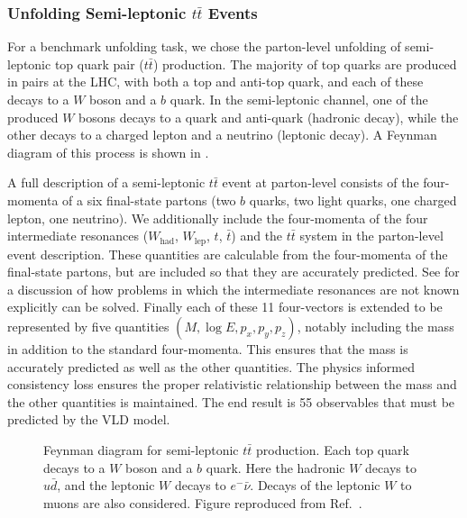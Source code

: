\subsubsection{Unfolding Semi-leptonic $t\bar{t}$ Events}

For a benchmark unfolding task, we chose the parton-level unfolding of semi-leptonic top quark pair ($t\bar{t}$) production.
The majority of top quarks are produced in pairs at the LHC, with both a top and anti-top quark, and each of these decays to a $W$ boson and a $b$ quark.
In the semi-leptonic channel, one of the produced $W$ bosons decays to a quark and anti-quark (hadronic decay), while the other decays to a charged lepton and a neutrino (leptonic decay).
A Feynman diagram of this process is shown in .

A full description of a semi-leptonic $t\bar{t}$ event at parton-level consists of the four-momenta of a six final-state partons (two $b$ quarks, two light quarks, one charged lepton, one neutrino).
We additionally include the four-momenta of the four intermediate resonances ($W_\text{had}$, $W_\text{lep}$, $t$, $\bar{t}$) and the $t\bar{t}$ system in the parton-level event description.
These quantities are calculable from the four-momenta of the final-state partons, but are included so that they are accurately predicted.
See  for a discussion of how problems in which the intermediate resonances are not known explicitly can be solved.
Finally each of these 11 four-vectors is extended to be represented by five quantities $(M, \log E, p_x, p_y, p_z)$, notably including the mass in addition to the standard four-momenta.
This ensures that the mass is accurately predicted as well as the other quantities.
The physics informed consistency loss ensures the proper relativistic relationship between the mass and the other quantities is maintained.
The end result is 55 observables that must be predicted by the VLD model.

\begin{figure}[t]
    \centering
    
    \caption{Feynman diagram for semi-leptonic $t\bar{t}$ production. Each top quark decays to a $W$ boson and a $b$ quark. Here the hadronic $W$ decays to $u\bar{d}$, and the leptonic $W$ decays to $e^- \bar{\nu}$. Decays of the leptonic $W$ to muons are also considered. Figure reproduced from Ref.~\cite{Shmakov:2023kjj}.}
    \label{fig:ttbar-feynman}
\end{figure}

